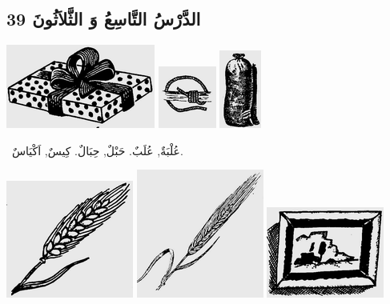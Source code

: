 \documentclass[a5paper]{article}
\begin{document}
\subsection[الدَّرْسُ التَّاسِعُ وَ الثَّلاَثُونَ 39]{الدَّرْسُ التَّاسِعُ وَ الثَّلاَثُونَ 39}
 \includegraphics[width=1.9272in,height=1.0835in]{images/MuhammadBagauddinprettified-img102.png}   \includegraphics[width=0.75in,height=0.802in]{images/MuhammadBagauddinprettified-img103.png}   \includegraphics[width=0.5417in,height=1.0102in]{images/MuhammadBagauddinprettified-img104.png}  

\ عُلْبَةٌ, عُلَبٌ. حَبْلٌ, حِبَالٌ. كِيسٌ, اَكْيَاسٌ. 

 \includegraphics[width=1.6457in,height=1.5209in]{images/MuhammadBagauddinprettified-img105.png}  \includegraphics[width=1.6457in,height=1.6665in]{images/MuhammadBagauddinprettified-img106.png}   \includegraphics[width=1.5209in,height=1.1772in]{images/MuhammadBagauddinprettified-img107.png} 
\end{document}

